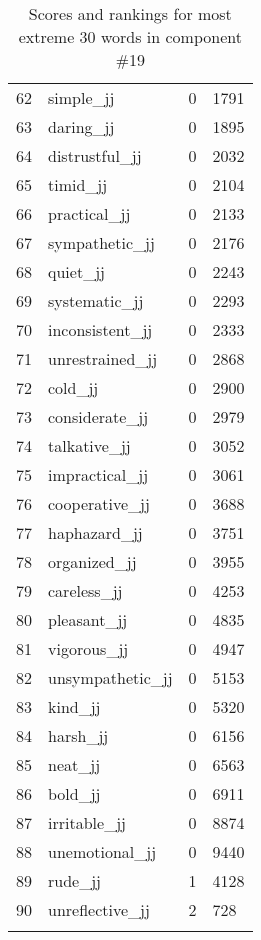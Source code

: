 \begin{longtable}[!htbp]{| rlr@{.}l |}
    62 & simple\_jj & 0 & 1791 \\
    63 & daring\_jj & 0 & 1895 \\
    64 & distrustful\_jj & 0 & 2032 \\
    65 & timid\_jj & 0 & 2104 \\
    66 & practical\_jj & 0 & 2133 \\
    67 & sympathetic\_jj & 0 & 2176 \\
    68 & quiet\_jj & 0 & 2243 \\
    69 & systematic\_jj & 0 & 2293 \\
    70 & inconsistent\_jj & 0 & 2333 \\
    71 & unrestrained\_jj & 0 & 2868 \\
    72 & cold\_jj & 0 & 2900 \\
    73 & considerate\_jj & 0 & 2979 \\
    74 & talkative\_jj & 0 & 3052 \\
    75 & impractical\_jj & 0 & 3061 \\
    76 & cooperative\_jj & 0 & 3688 \\
    77 & haphazard\_jj & 0 & 3751 \\
    78 & organized\_jj & 0 & 3955 \\
    79 & careless\_jj & 0 & 4253 \\
    80 & pleasant\_jj & 0 & 4835 \\
    81 & vigorous\_jj & 0 & 4947 \\
    82 & unsympathetic\_jj & 0 & 5153 \\
    83 & kind\_jj & 0 & 5320 \\
    84 & harsh\_jj & 0 & 6156 \\
    85 & neat\_jj & 0 & 6563 \\
    86 & bold\_jj & 0 & 6911 \\
    87 & irritable\_jj & 0 & 8874 \\
    88 & unemotional\_jj & 0 & 9440 \\
    89 & rude\_jj & 1 & 4128 \\
    90 & unreflective\_jj & 2 & 728 \\
    \hline
    \caption{Scores and rankings for most extreme 30 words in component \#19} \\
\end{longtable}
